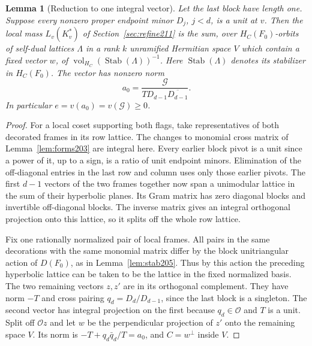 \documentclass[a4paper,11pt]{article}
\newtheorem{lemma}[proposition]{Lemma}
\theoremstyle{definition}
\theoremstyle{remark}
\numberwithin{equation}{section}
\begin{document}
\begin{lemma}[Reduction to one integral vector]
\label{lem:vector213}
Let the last block have length one. Suppose every nonzero proper
endpoint minor \(D_j\), \(j<d\), is a unit at \(v\). Then the local
mass \(L_v(K^*_v)\) of Section~\ref{sec:refine211} is the sum,
over \(H_C(F_0)\)-orbits of self-dual lattices \(\Lambda\) in a
rank \(k\) unramified Hermitian space \(V\) which contain a fixed
vector \(w\), of
\(\operatorname{vol}_{H_C}(\operatorname{Stab}(\Lambda))^{-1}\).
Here \(\operatorname{Stab}(\Lambda)\) denotes its stabilizer in
\(H_C(F_0)\). The vector has nonzero norm
\[
                 a_0=\frac{\mathcal G}
                              {T D_{d-1}\overline{D_{d-1}}}.
\]
In particular \(e=v(a_0)=v(\mathcal G)\ge0\).
\end{lemma}
\begin{proof}
For a local coset supporting both flags, take representatives of
both decorated frames in its row lattice. The changes to monomial
cross matrix of Lemma~\ref{lem:forms203} are integral here.
Every earlier block pivot is a unit since a power of it, up to
a sign, is a ratio of unit endpoint minors. Elimination of the
off-diagonal entries in the last row and column uses only those
earlier pivots. The first \(d-1\) vectors of the two frames together
now span a unimodular lattice in the sum of their hyperbolic planes.
Its Gram matrix has zero diagonal blocks and invertible off-diagonal
blocks. The inverse matrix gives an integral orthogonal projection
onto this lattice, so it splits off the whole row lattice.

Fix one rationally normalized pair of local frames. All pairs
in the same decorations with the same monomial matrix differ by
the block unitriangular action of \(D(F_0)\), as in
Lemma~\ref{lem:stab205}. Thus by this action the preceding
hyperbolic lattice can be taken to be the lattice in the fixed
normalized basis. The two remaining vectors \(z,z'\) are in its
orthogonal complement. They have norm \(-T\) and cross pairing
\(q_d=D_d/D_{d-1}\), since the last block is a singleton.
The second vector has integral projection on the first because
\(q_d\in\mathcal O\) and \(T\) is a unit. Split off \(\mathcal O z\)
and let \(w\) be the perpendicular projection of \(z'\) onto the
remaining space \(V\). Its norm is \(-T+q_d\bar q_d/T=a_0\), and
\(C=w^\perp\) inside \(V\).


\end{proof}
\end{document}

